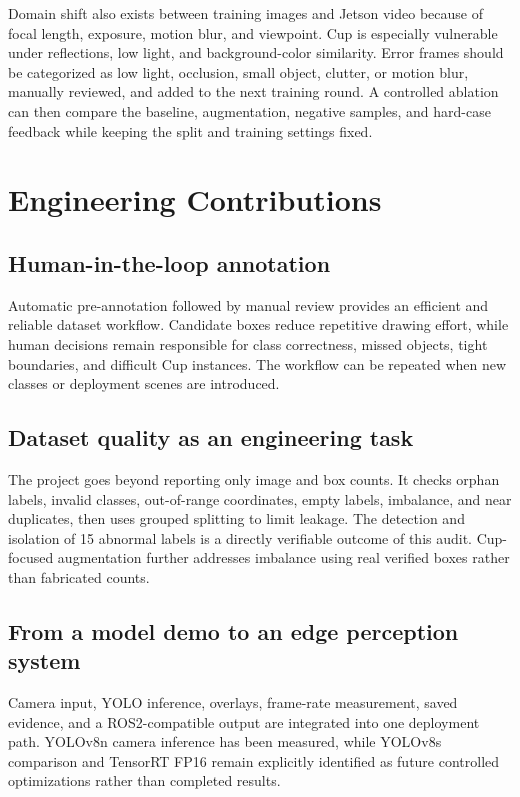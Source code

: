 \documentclass[a4paper,11pt]{article}
\begin{document}
Domain shift also exists between training images and Jetson video because of focal length, exposure, motion blur, and viewpoint. Cup is especially vulnerable under reflections, low light, and background-color similarity. Error frames should be categorized as low light, occlusion, small object, clutter, or motion blur, manually reviewed, and added to the next training round. A controlled ablation can then compare the baseline, augmentation, negative samples, and hard-case feedback while keeping the split and training settings fixed.

\section{Engineering Contributions}
\subsection{Human-in-the-loop annotation}
Automatic pre-annotation followed by manual review provides an efficient and reliable dataset workflow. Candidate boxes reduce repetitive drawing effort, while human decisions remain responsible for class correctness, missed objects, tight boundaries, and difficult Cup instances. The workflow can be repeated when new classes or deployment scenes are introduced.

\subsection{Dataset quality as an engineering task}
The project goes beyond reporting only image and box counts. It checks orphan labels, invalid classes, out-of-range coordinates, empty labels, imbalance, and near duplicates, then uses grouped splitting to limit leakage. The detection and isolation of 15 abnormal labels is a directly verifiable outcome of this audit. Cup-focused augmentation further addresses imbalance using real verified boxes rather than fabricated counts.

\subsection{From a model demo to an edge perception system}
Camera input, YOLO inference, overlays, frame-rate measurement, saved evidence, and a ROS2-compatible output are integrated into one deployment path. YOLOv8n camera inference has been measured, while YOLOv8s comparison and TensorRT FP16 remain explicitly identified as future controlled optimizations rather than completed results.
\end{document}
